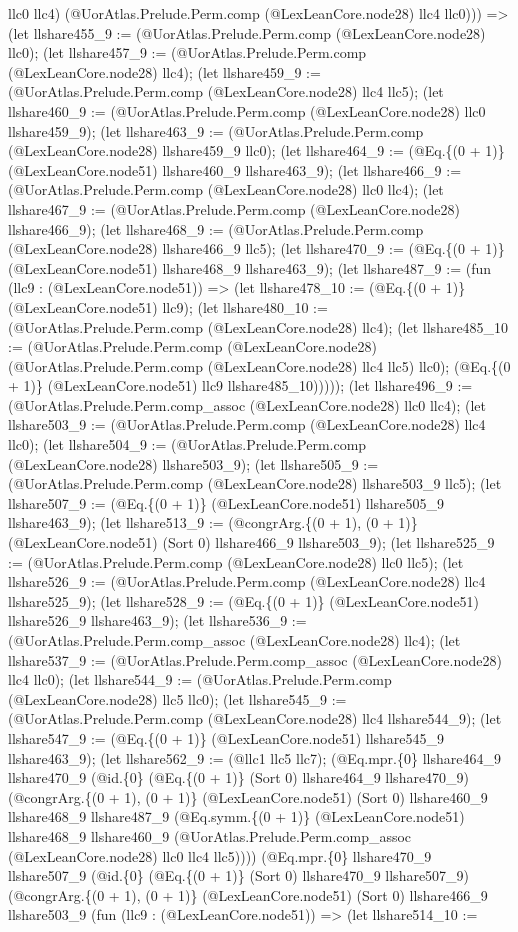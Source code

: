 \documentclass[11pt]{article}
\begin{document}
llc0 llc4) (@UorAtlas.Prelude.Perm.comp (@LexLeanCore.node28) llc4 llc0))) => (let llshare455\_9 := (@UorAtlas.Prelude.Perm.comp (@LexLeanCore.node28) llc0); (let llshare457\_9 := (@UorAtlas.Prelude.Perm.comp (@LexLeanCore.node28) llc4); (let llshare459\_9 := (@UorAtlas.Prelude.Perm.comp (@LexLeanCore.node28) llc4 llc5); (let llshare460\_9 := (@UorAtlas.Prelude.Perm.comp (@LexLeanCore.node28) llc0 llshare459\_9); (let llshare463\_9 := (@UorAtlas.Prelude.Perm.comp (@LexLeanCore.node28) llshare459\_9 llc0); (let llshare464\_9 := (@Eq.\{(0 + 1)\} (@LexLeanCore.node51) llshare460\_9 llshare463\_9); (let llshare466\_9 := (@UorAtlas.Prelude.Perm.comp (@LexLeanCore.node28) llc0 llc4); (let llshare467\_9 := (@UorAtlas.Prelude.Perm.comp (@LexLeanCore.node28) llshare466\_9); (let llshare468\_9 := (@UorAtlas.Prelude.Perm.comp (@LexLeanCore.node28) llshare466\_9 llc5); (let llshare470\_9 := (@Eq.\{(0 + 1)\} (@LexLeanCore.node51) llshare468\_9 llshare463\_9); (let llshare487\_9 := (fun (llc9 : (@LexLeanCore.node51)) => (let llshare478\_10 := (@Eq.\{(0 + 1)\} (@LexLeanCore.node51) llc9); (let llshare480\_10 := (@UorAtlas.Prelude.Perm.comp (@LexLeanCore.node28) llc4); (let llshare485\_10 := (@UorAtlas.Prelude.Perm.comp (@LexLeanCore.node28) (@UorAtlas.Prelude.Perm.comp (@LexLeanCore.node28) llc4 llc5) llc0); (@Eq.\{(0 + 1)\} (@LexLeanCore.node51) llc9 llshare485\_10))))); (let llshare496\_9 := (@UorAtlas.Prelude.Perm.comp\_assoc (@LexLeanCore.node28) llc0 llc4); (let llshare503\_9 := (@UorAtlas.Prelude.Perm.comp (@LexLeanCore.node28) llc4 llc0); (let llshare504\_9 := (@UorAtlas.Prelude.Perm.comp (@LexLeanCore.node28) llshare503\_9); (let llshare505\_9 := (@UorAtlas.Prelude.Perm.comp (@LexLeanCore.node28) llshare503\_9 llc5); (let llshare507\_9 := (@Eq.\{(0 + 1)\} (@LexLeanCore.node51) llshare505\_9 llshare463\_9); (let llshare513\_9 := (@congrArg.\{(0 + 1), (0 + 1)\} (@LexLeanCore.node51) (Sort 0) llshare466\_9 llshare503\_9); (let llshare525\_9 := (@UorAtlas.Prelude.Perm.comp (@LexLeanCore.node28) llc0 llc5); (let llshare526\_9 := (@UorAtlas.Prelude.Perm.comp (@LexLeanCore.node28) llc4 llshare525\_9); (let llshare528\_9 := (@Eq.\{(0 + 1)\} (@LexLeanCore.node51) llshare526\_9 llshare463\_9); (let llshare536\_9 := (@UorAtlas.Prelude.Perm.comp\_assoc (@LexLeanCore.node28) llc4); (let llshare537\_9 := (@UorAtlas.Prelude.Perm.comp\_assoc (@LexLeanCore.node28) llc4 llc0); (let llshare544\_9 := (@UorAtlas.Prelude.Perm.comp (@LexLeanCore.node28) llc5 llc0); (let llshare545\_9 := (@UorAtlas.Prelude.Perm.comp (@LexLeanCore.node28) llc4 llshare544\_9); (let llshare547\_9 := (@Eq.\{(0 + 1)\} (@LexLeanCore.node51) llshare545\_9 llshare463\_9); (let llshare562\_9 := (@llc1 llc5 llc7); (@Eq.mpr.\{0\} llshare464\_9 llshare470\_9 (@id.\{0\} (@Eq.\{(0 + 1)\} (Sort 0) llshare464\_9 llshare470\_9) (@congrArg.\{(0 + 1), (0 + 1)\} (@LexLeanCore.node51) (Sort 0) llshare460\_9 llshare468\_9 llshare487\_9 (@Eq.symm.\{(0 + 1)\} (@LexLeanCore.node51) llshare468\_9 llshare460\_9 (@UorAtlas.Prelude.Perm.comp\_assoc (@LexLeanCore.node28) llc0 llc4 llc5)))) (@Eq.mpr.\{0\} llshare470\_9 llshare507\_9 (@id.\{0\} (@Eq.\{(0 + 1)\} (Sort 0) llshare470\_9 llshare507\_9) (@congrArg.\{(0 + 1), (0 + 1)\} (@LexLeanCore.node51) (Sort 0) llshare466\_9 llshare503\_9 (fun (llc9 : (@LexLeanCore.node51)) => (let llshare514\_10 := 
\end{document}
